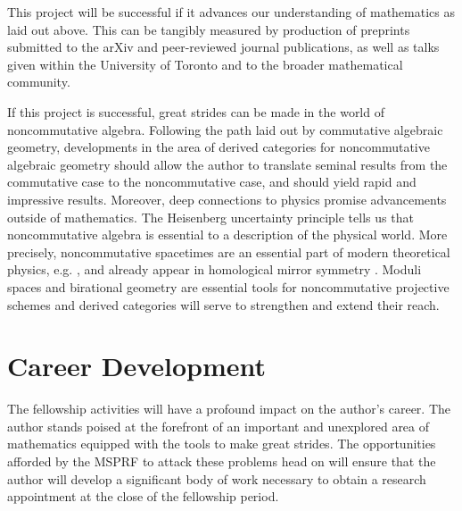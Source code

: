 \documentclass[11pt]{article}
\begin{document}

This project will be successful if it advances our understanding of mathematics as laid out above.  This can be tangibly measured by production of preprints submitted to the arXiv and peer-reviewed journal publications, as well as talks given within the University of Toronto and to the broader mathematical community.


If this project is successful, great strides can be made in the world of noncommutative algebra.
Following the path laid out by commutative algebraic geometry, developments in the area of derived categories for noncommutative algebraic geometry should allow the author to translate seminal results from the commutative case to the noncommutative case, and should yield rapid and impressive results.
Moreover, deep connections to physics promise advancements outside of mathematics.
The Heisenberg uncertainty principle tells us that noncommutative algebra is essential to a description of the physical world.
More precisely, noncommutative spacetimes are an essential part of modern theoretical physics, e.g. \cite{DoNe01}, and already appear in homological mirror symmetry \cite{AKO08}.
Moduli spaces and birational geometry are essential tools for noncommutative projective schemes and derived categories will serve to strengthen and extend their reach.



\section{Career Development}
The fellowship activities will have a profound impact on the author's career.
The author stands poised at the forefront of an important and unexplored area of mathematics equipped with the tools to make great strides.
The opportunities afforded by the MSPRF to attack these problems head on will ensure that the author will develop a significant body of work necessary to obtain a research appointment at the close of the fellowship period.
\end{document}
